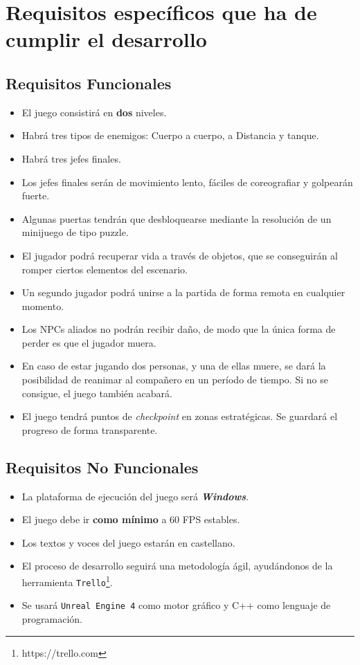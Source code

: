 \documentclass[11pt, twoside]{article}
\begin{document}
\section{Requisitos específicos que ha de \\ cumplir el desarrollo}

\subsection{Requisitos Funcionales}
\begin{itemize}
\item El juego consistirá en \textbf{dos} niveles.
\item Habrá tres tipos de enemigos: Cuerpo a cuerpo, a Distancia y tanque.
\item Habrá tres jefes finales.
\item Los jefes finales serán de movimiento lento, fáciles de coreografiar y golpearán fuerte.
\item Algunas puertas tendrán que desbloquearse mediante la resolución de un minijuego de tipo puzzle.
\item El jugador podrá recuperar vida a través de objetos, que se conseguirán al romper ciertos elementos del escenario.
\item Un segundo jugador podrá unirse a la partida de forma remota en cualquier momento.
\item Los NPCs aliados no podrán recibir daño, de modo que la única forma de perder es que el jugador muera.
\item En caso de estar jugando dos personas, y una de ellas muere, se dará la posibilidad de reanimar al compañero en un período de tiempo. Si no se consigue, el juego también acabará.
\item El juego tendrá puntos de \textit{checkpoint} en zonas estratégicas. Se guardará el progreso de forma transparente.
\end{itemize}

\subsection{Requisitos No Funcionales}
\begin{itemize}
\item La plataforma de ejecución del juego será \textbf{\textit{Windows}}.
\item El juego debe ir \textbf{como mínimo} a 60 FPS estables.
\item Los textos y voces del juego estarán en castellano.
\item El proceso de desarrollo seguirá una metodología ágil, ayudándonos de la herramienta \texttt{Trello}\footnote{https://trello.com}.
\item Se usará \texttt{Unreal Engine 4} como motor gráfico y C++ como lenguaje de programación.
\end{itemize}
\end{document}
